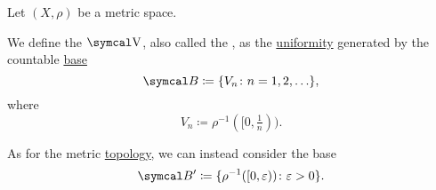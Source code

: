 \begin{definition}\label{def:metric_uniformity}
  Let \( (X, \rho) \) be a metric space.

  We define the  \( \CV \), also called the , as the \hyperref[def:uniform_space]{uniformity} generated by the countable \hyperref[thm:uniform_space_base_axioms]{base}
  \begin{equation}\label{def:metric_uniformity/integer_base}
    \Cal{B} \coloneqq \{ V_n \colon n = 1, 2, \ldots \},
  \end{equation}
  where
  \begin{equation*}
    V_n \coloneqq \rho^{-1}([0, \tfrac 1 n)).
  \end{equation*}

  As for the metric \hyperref[def:metric_topology]{topology}, we can instead consider the base
  \begin{equation}\label{def:metric_uniformity/real_base}
    \Cal{B}' \coloneqq \{ \rho^{-1}([0, \varepsilon)) \colon \varepsilon > 0 \}.
  \end{equation}
\end{definition}
